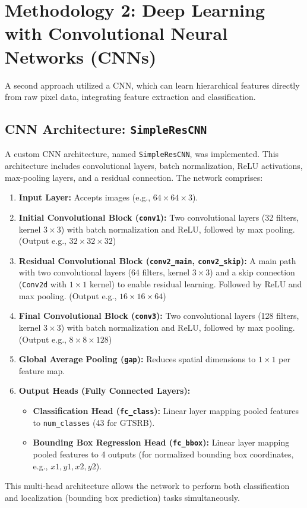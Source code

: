 \documentclass[11pt, a4paper]{article}
\begin{document}
\section{Methodology 2: Deep Learning with Convolutional Neural Networks (CNNs)}
A second approach utilized a CNN, which can learn hierarchical features directly from raw pixel data, integrating feature extraction and classification.

\subsection{CNN Architecture: \texttt{SimpleResCNN}}
A custom CNN architecture, named \texttt{SimpleResCNN}, was implemented. This architecture includes convolutional layers, batch normalization, ReLU activations, max-pooling layers, and a residual connection.
The network comprises:
\begin{enumerate}
    \item \textbf{Input Layer:} Accepts images (e.g., $64 \times 64 \times 3$).
    \item \textbf{Initial Convolutional Block (\texttt{conv1}):} Two convolutional layers (32 filters, kernel $3 \times 3$) with batch normalization and ReLU, followed by max pooling. (Output e.g., $32 \times 32 \times 32$)
    \item \textbf{Residual Convolutional Block (\texttt{conv2\_main}, \texttt{conv2\_skip}):} A main path with two convolutional layers (64 filters, kernel $3 \times 3$) and a skip connection (\texttt{Conv2d} with $1 \times 1$ kernel) to enable residual learning. Followed by ReLU and max pooling. (Output e.g., $16 \times 16 \times 64$)
    \item \textbf{Final Convolutional Block (\texttt{conv3}):} Two convolutional layers (128 filters, kernel $3 \times 3$) with batch normalization and ReLU, followed by max pooling. (Output e.g., $8 \times 8 \times 128$)
    \item \textbf{Global Average Pooling (\texttt{gap}):} Reduces spatial dimensions to $1 \times 1$ per feature map.
    \item \textbf{Output Heads (Fully Connected Layers):}
        \begin{itemize}
            \item \textbf{Classification Head (\texttt{fc\_class}):} Linear layer mapping pooled features to \texttt{num\_classes} (43 for GTSRB).
            \item \textbf{Bounding Box Regression Head (\texttt{fc\_bbox}):} Linear layer mapping pooled features to 4 outputs (for normalized bounding box coordinates, e.g., $x1, y1, x2, y2$).
        \end{itemize}
\end{enumerate}
This multi-head architecture allows the network to perform both classification and localization (bounding box prediction) tasks simultaneously.
\end{document}
